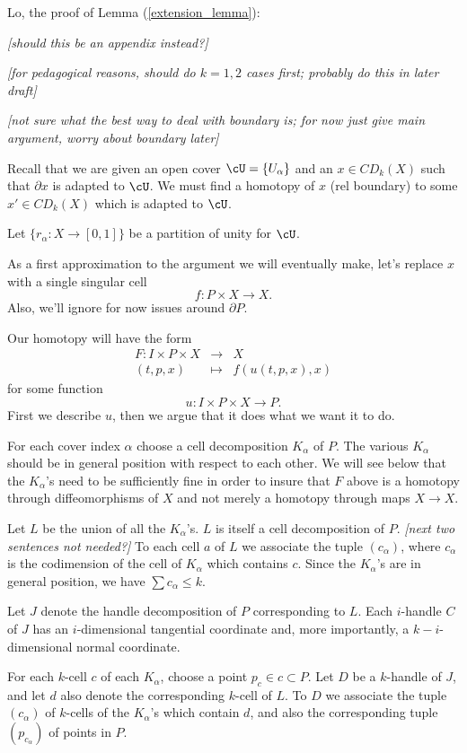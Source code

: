 \documentclass[11pt,leqno]{article}
\def\bd{\partial}
\def\sub{\subset}
\def\nn#1{{{\it \small [#1]}}}
\newcommand{\eq}[1]{\begin{displaymath}#1\end{displaymath}}
\newcommand{\eqar}[1]{\begin{eqnarray*}#1\end{eqnarray*}}
\begin{document}
Lo, the proof of Lemma (\ref{extension_lemma}):

\nn{should this be an appendix instead?}

\nn{for pedagogical reasons, should do $k=1,2$ cases first; probably do this in
later draft}

\nn{not sure what the best way to deal with boundary is; for now just give main argument, worry
about boundary later}

Recall that we are given 
an open cover $\cU = \{U_\alpha\}$ and an
$x \in CD_k(X)$ such that $\bd x$ is adapted to $\cU$.
We must find a homotopy of $x$ (rel boundary) to some $x' \in CD_k(X)$ which is adapted to $\cU$.

Let $\{r_\alpha : X \to [0,1]\}$ be a partition of unity for $\cU$.

As a first approximation to the argument we will eventually make, let's replace $x$
with a single singular cell 
\eq{
	f: P \times X \to X .
}
Also, we'll ignore for now issues around $\bd P$.

Our homotopy will have the form
\eqar{
	F: I \times P \times X &\to& X \\
	(t, p, x) &\mapsto& f(u(t, p, x), x)
}
for some function
\eq{
	u : I \times P \times X \to P .
}
First we describe $u$, then we argue that it does what we want it to do.

For each cover index $\alpha$ choose a cell decomposition $K_\alpha$ of $P$.
The various $K_\alpha$ should be in general position with respect to each other.
We will see below that the $K_\alpha$'s need to be sufficiently fine in order
to insure that $F$ above is a homotopy through diffeomorphisms of $X$ and not
merely a homotopy through maps $X\to X$.

Let $L$ be the union of all the $K_\alpha$'s.
$L$ is itself a cell decomposition of $P$.
\nn{next two sentences not needed?}
To each cell $a$ of $L$ we associate the tuple $(c_\alpha)$,
where $c_\alpha$ is the codimension of the cell of $K_\alpha$ which contains $c$.
Since the $K_\alpha$'s are in general position, we have $\sum c_\alpha \le k$.

Let $J$ denote the handle decomposition of $P$ corresponding to $L$.
Each $i$-handle $C$ of $J$ has an $i$-dimensional tangential coordinate and,
more importantly, a $k{-}i$-dimensional normal coordinate.

For each $k$-cell $c$ of each $K_\alpha$, choose a point $p_c \in c \sub P$.
Let $D$ be a $k$-handle of $J$, and let $d$ also denote the corresponding
$k$-cell of $L$.
To $D$ we associate the tuple $(c_\alpha)$ of $k$-cells of the $K_\alpha$'s
which contain $d$, and also the corresponding tuple $(p_{c_\alpha})$ of points in $P$.
\end{document}
